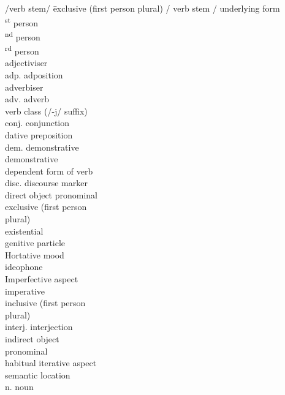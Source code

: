 
\begin{multicols}{2} 
\setlength{\parindent}{0pt}
\begin{tabbing}
	\slash verb stem\slash \hspace{1em} \= exclusive (first person plural)\hspace{1em}\kill
	/ verb stem / \> underlying form\\
	 \textsuperscript{st} person\\
	 \textsuperscript{nd} person\\
	 \textsuperscript{rd} person \\
	\ADJ \> adjectiviser\\
	adp. \> adposition \\
	\ADV \> adverbiser\\
	adv. \> adverb\\
	\CL \> verb class (/-j/ suffix)\\
	conj. \> conjunction\\
	\DAT \> dative preposition\\
	dem.\> demonstrative\\
	\DEM\> demonstrative\\
	\DEP \> dependent form of verb\\
	disc. \> discourse marker \\
	\DO \> direct object pronominal\\
	\EX \> exclusive (first person\\\> plural)\\
	\EXT \> existential\\
	\GEN \> genitive particle\\
	\HOR \> Hortative mood \\
	\ID \> ideophone\\
	\IFV \> Imperfective aspect\\
	\IMP \> imperative\\
	\IN \> inclusive (first person \\\>plural)\\
	interj. \> interjection \\
	\IO \> indirect object \\ \> pronominal \\
	\ITR \> habitual iterative aspect\\
	\LOC \> semantic location\\
	n. \> noun\\

\end{tabbing}
\end{multicols}
